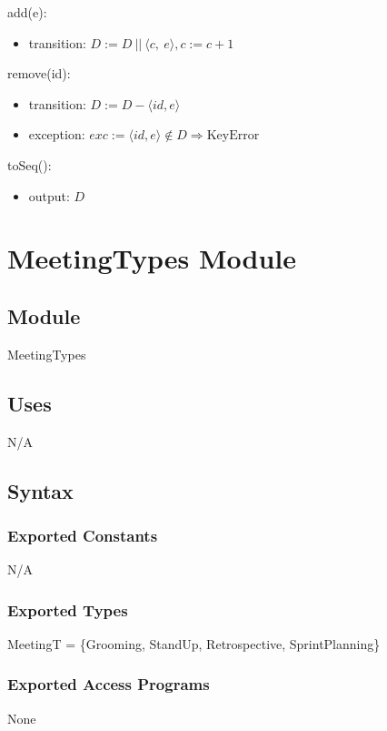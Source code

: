 \documentclass[12pt, titlepage]{article}
\begin{document}
\noindent add(e):
\begin{itemize}
    \item transition: $D :=  D\ ||\ \langle c,\ e \rangle, c := c + 1$
\end{itemize}

\noindent remove(id):
\begin{itemize}
    \item transition: $D :=  D - \langle id, e \rangle$
    \item exception: $exc := \langle id, e \rangle \notin D \Rightarrow \text{KeyError}$
\end{itemize}

\noindent toSeq():
\begin{itemize}
    \item output: $D$
\end{itemize}

\newpage

\section* {MeetingTypes Module}

\subsection* {Module}
MeetingTypes

\subsection*{Uses}
N/A

\subsection*{Syntax}
\subsubsection*{Exported Constants}
N/A

\subsubsection*{Exported Types}
MeetingT = \{Grooming, StandUp, Retrospective, SprintPlanning\}

\subsubsection*{Exported Access Programs}
None
\end{document}
